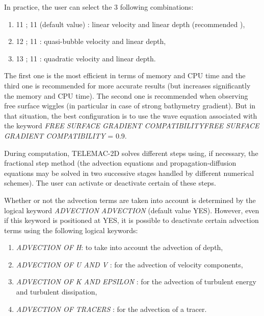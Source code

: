   In practice, the user can select the 3 following combinations:

\begin{enumerate}
\item  11 ; 11 (default value) : linear velocity and linear depth (recommended ),

\item  12 ; 11 : quasi-bubble velocity and linear depth,

\item  13 ; 11 : quadratic velocity and linear depth.
\end{enumerate}

 The first one is the most efficient in terms of memory and CPU time and the third one is recommended for more accurate results (but increases significantly the memory and CPU time). The second one is recommended when observing free surface wiggles (in particular in case of strong bathymetry gradient). But in that situation, the best configuration is to use the wave equation associated with the keyword \textit{FREE SURFACE GRADIENT COMPATIBILITYFREE SURFACE GRADIENT COMPATIBILITY} = 0.9.

 During computation, TELEMAC-2D solves different steps using, if necessary, the fractional step method (the advection equations and propagation-diffusion equations may be solved in two successive stages handled by different numerical schemes). The user can activate or deactivate certain of these steps.

 Whether or not the advection terms are taken into account is determined by the logical keyword \textit{ADVECTION} \textit{ADVECTION} (default value YES). However, even if this keyword is positioned at YES, it is possible to deactivate certain advection terms using the following logical keywords:

\begin{enumerate}
\item  \textit{ADVECTION OF H}: to take into account the advection of depth,

\item  \textit{ADVECTION OF U AND V} : for the advection of velocity components,

\item  \textit{ADVECTION OF K AND EPSILON} : for the advection of turbulent energy and turbulent dissipation,

\item  \textit{ADVECTION OF TRACERS} : for the advection of a tracer.
\end{enumerate}

